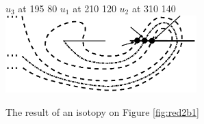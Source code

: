 \documentclass[11pt]{article}
\theoremstyle{plain} \newtheorem{thm}{Theorem}[subsection]
\theoremstyle{plain} \newtheorem{cor}[thm]{Corollary}
\theoremstyle{plain} \newtheorem{prop}[thm]{Proposition}
\theoremstyle{plain} \newtheorem{conj}[thm]{Conjecture}
\theoremstyle{plain} \newtheorem{lem}[thm]{Lemma}
\theoremstyle{definition} \newtheorem{df}[thm]{Definition}
\theoremstyle{remark} \newtheorem{rmk}[thm]{Remark}
\theoremstyle{remark} \newtheorem{obs}[thm]{Observation}
\newcommand{\ba}{\boldsymbol{\alpha}}
\newcommand{\bb}{\boldsymbol{\beta}}
\numberwithin{equation}{section}
\begin{document}
%
%
%

\begin{figure}[h!]
\centering
\begin{minipage}[c]{.50\linewidth}
\small
\pinlabel* $u_{3}$ at 195 80
\pinlabel* $u_{1}$ at 210 120
\pinlabel* $u_{2}$ at 310 140
\endlabellist
\includegraphics[height = 30mm]{Red2Ab_mod_iso}
\end{minipage}
\begin{minipage}[c]{.45\linewidth}
\caption{The result of an isotopy on Figure \ref{fig:red2b1}}
\label{fig:red2biso}
\end{minipage}
\end{figure}
\end{document}
